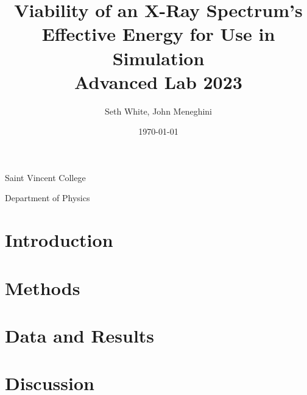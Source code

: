 \documentclass[12pt, letterpaper]{article}
\title{Viability of an X-Ray Spectrum's Effective Energy for Use in Simulation \\
    \large Advanced Lab 2023}
\author{Seth White, John Meneghini}
\date{\today}
\begin{document}
    \maketitle

\centerline{\large Saint Vincent College}
\centerline{Department of Physics}

    \begin{abstract}
        
    \end{abstract}
\newpage
	
    \section*{Introduction}
    


    \section*{Methods}
    

	\newpage
    \section*{Data and Results}
    

	\newpage
    \section*{Discussion}
    

    \newpage
    
\end{document}
